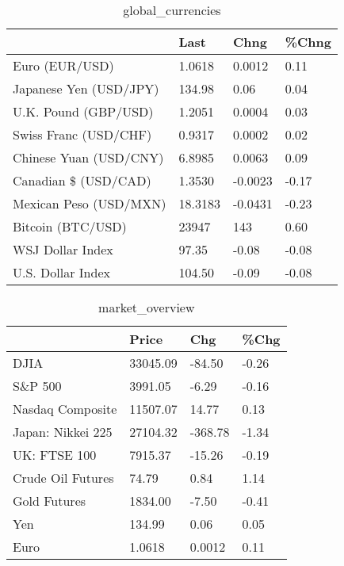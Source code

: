 \documentclass{article}%
\begin{document}
%


\begin{table}[htbp]%
\caption{global\_currencies}%
\centering%
\begin{adjustbox}{width=1\textwidth}%
\begin{tabular}{llll}
\toprule
                       &    Last &    Chng & \%Chng \\
\midrule
        Euro (EUR/USD) &  1.0618 &  0.0012 &  0.11 \\
Japanese Yen (USD/JPY) &  134.98 &    0.06 &  0.04 \\
  U.K. Pound (GBP/USD) &  1.2051 &  0.0004 &  0.03 \\
 Swiss Franc (USD/CHF) &  0.9317 &  0.0002 &  0.02 \\
Chinese Yuan (USD/CNY) &  6.8985 &  0.0063 &  0.09 \\
  Canadian \$ (USD/CAD) &  1.3530 & -0.0023 & -0.17 \\
Mexican Peso (USD/MXN) & 18.3183 & -0.0431 & -0.23 \\
     Bitcoin (BTC/USD) &   23947 &     143 &  0.60 \\
      WSJ Dollar Index &   97.35 &   -0.08 & -0.08 \\
     U.S. Dollar Index &  104.50 &   -0.09 & -0.08 \\
\bottomrule
\end{tabular}
%
\end{adjustbox}%
\end{table}

%


\begin{table}[htbp]%
\caption{market\_overview}%
\centering%
\begin{adjustbox}{width=1\textwidth}%
\begin{tabular}{llll}
\toprule
                  &    Price &     Chg &  \%Chg \\
\midrule
             DJIA & 33045.09 &  -84.50 & -0.26 \\
          S\&P 500 &  3991.05 &   -6.29 & -0.16 \\
 Nasdaq Composite & 11507.07 &   14.77 &  0.13 \\
Japan: Nikkei 225 & 27104.32 & -368.78 & -1.34 \\
     UK: FTSE 100 &  7915.37 &  -15.26 & -0.19 \\
Crude Oil Futures &    74.79 &    0.84 &  1.14 \\
     Gold Futures &  1834.00 &   -7.50 & -0.41 \\
              Yen &   134.99 &    0.06 &  0.05 \\
             Euro &   1.0618 &  0.0012 &  0.11 \\
\bottomrule
\end{tabular}
%
\end{adjustbox}%
\end{table}

%
\end{document}
